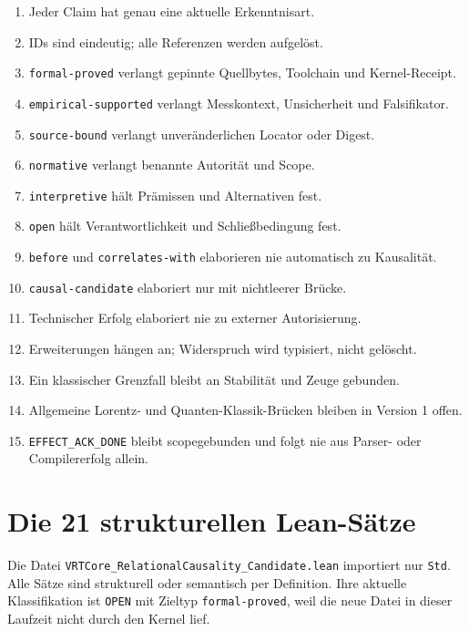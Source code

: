 \documentclass[11pt,a4paper]{article}
\newcommand{\code}[1]{\texttt{#1}}
\begin{document}
\begin{enumerate}[label=\texttt{S\arabic*.}]
  \item Jeder Claim hat genau eine aktuelle Erkenntnisart.
  \item IDs sind eindeutig; alle Referenzen werden aufgelöst.
  \item \code{formal-proved} verlangt gepinnte Quellbytes, Toolchain und
  Kernel-Receipt.
  \item \code{empirical-supported} verlangt Messkontext, Unsicherheit und
  Falsifikator.
  \item \code{source-bound} verlangt unveränderlichen Locator oder Digest.
  \item \code{normative} verlangt benannte Autorität und Scope.
  \item \code{interpretive} hält Prämissen und Alternativen fest.
  \item \code{open} hält Verantwortlichkeit und Schließbedingung fest.
  \item \code{before} und \code{correlates-with} elaborieren nie automatisch
  zu Kausalität.
  \item \code{causal-candidate} elaboriert nur mit nichtleerer Brücke.
  \item Technischer Erfolg elaboriert nie zu externer Autorisierung.
  \item Erweiterungen hängen an; Widerspruch wird typisiert, nicht gelöscht.
  \item Ein klassischer Grenzfall bleibt an Stabilität und Zeuge gebunden.
  \item Allgemeine Lorentz- und Quanten-Klassik-Brücken bleiben in Version 1
  offen.
  \item \code{EFFECT\_ACK\_DONE} bleibt scopegebunden und folgt nie aus
  Parser- oder Compilererfolg allein.
\end{enumerate}

\section{Die 21 strukturellen Lean-Sätze}

Die Datei \code{VRTCore\_RelationalCausality\_Candidate.lean} importiert nur
\code{Std}. Alle Sätze sind strukturell oder semantisch per Definition. Ihre
aktuelle Klassifikation ist \code{OPEN} mit Zieltyp \code{formal-proved}, weil
die neue Datei in dieser Laufzeit nicht durch den Kernel lief.
\end{document}
